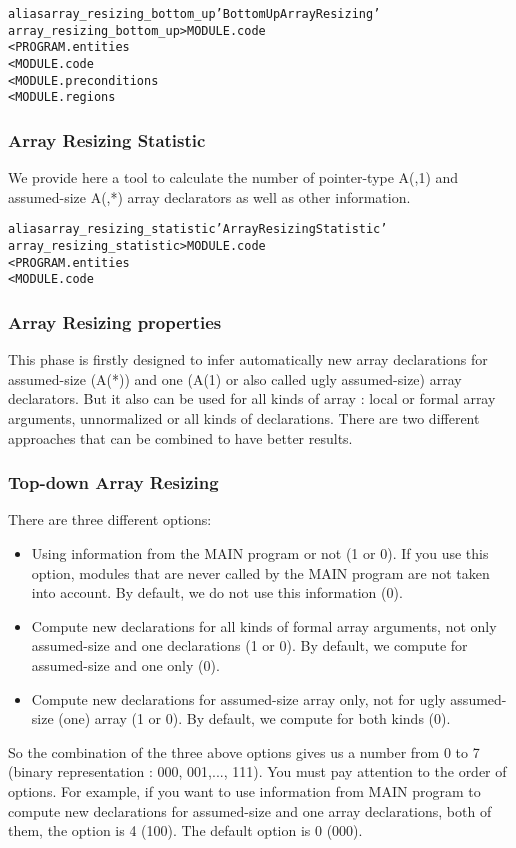 \documentclass[a4paper]{report}
\newenvironment{PipsMake}{\begin{alltt}}{\end{alltt}}
\begin{document}
\begin{PipsMake}
alias array_resizing_bottom_up 'Bottom Up Array Resizing'
array_resizing_bottom_up         > MODULE.code
        < PROGRAM.entities
        < MODULE.code
        < MODULE.preconditions
        < MODULE.regions
\end{PipsMake}

\subsubsection{Array Resizing Statistic}

We provide here a tool to calculate the number of pointer-type A(,1) and
assumed-size A(,*) array declarators as well as other information.

\begin{PipsMake}
alias array_resizing_statistic 'Array Resizing Statistic'
array_resizing_statistic   > MODULE.code
        < PROGRAM.entities
        < MODULE.code
\end{PipsMake}

\subsubsection{Array Resizing properties}

This phase is firstly designed to infer automatically new array
declarations for assumed-size (A(*)) and one (A(1) or also called ugly
assumed-size) array declarators. But
it also can be used for all kinds of array : local or formal array
arguments, unnormalized or all kinds of declarations. There are two
different approaches that can be combined to have better results.

\subsubsection*{Top-down Array Resizing}
There are three different options:
\begin{itemize}
\item Using information from the MAIN program or not (1 or 0). If you use
  this option, modules that are never called by the MAIN program are not
  taken into account. By default, we do not use this information (0). 
\item Compute new declarations for all kinds of formal array arguments,
  not only assumed-size and one declarations (1 or 0). By default, we
  compute for assumed-size and one only (0).
\item Compute new declarations for assumed-size array only, not for ugly
  assumed-size (one) array (1 or 0). By default, we compute for both kinds
  (0).
\end{itemize}
So the combination of the three above options gives us a number from 0 to
7 (binary representation : 000, 001,..., 111). You must pay attention to
the order of options. For example, if you want to use information from
MAIN program to compute new declarations for assumed-size and one array
declarations, both of them, the option is 4 (100). The default option is 0
(000).
\end{document}
